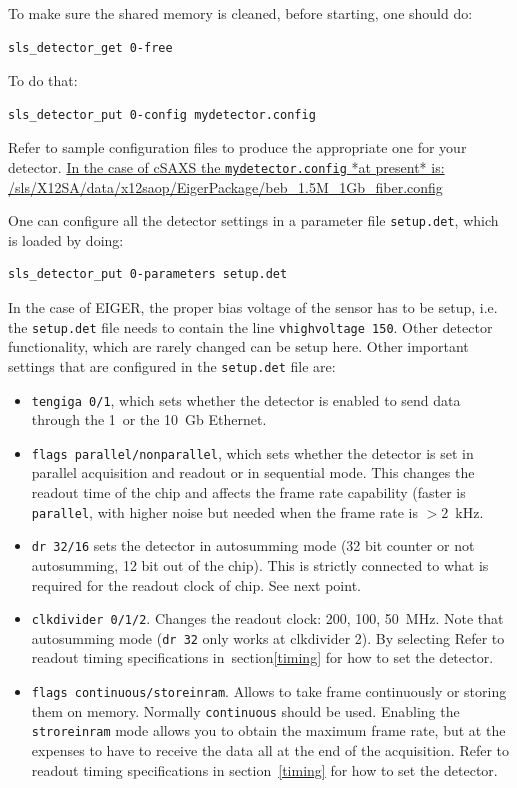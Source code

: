 \documentclass{article}
\newcommand{\E}{EIGER\xspace}
\begin{document}
To make sure the shared memory is cleaned, before starting, one should do:  
\begin{verbatim}
sls_detector_get 0-free
\end{verbatim}
To do that:
\begin{verbatim}
sls_detector_put 0-config mydetector.config
\end{verbatim}
Refer to sample configuration files to produce the appropriate one for your detector.
\underline{In the case of cSAXS the {\tt{mydetector.config}} *at present* is:}\\ 
\underline{/sls/X12SA/data/x12saop/EigerPackage/beb\_1.5M\_1Gb\_fiber.config}

One can configure all the detector settings in a parameter file {\tt{setup.det}}, which is loaded by doing:
\begin{verbatim}
sls_detector_put 0-parameters setup.det
\end{verbatim}

In the case of \E, the proper bias voltage of the sensor has to be setup, i.e. the {\tt{setup.det}} file needs to contain the line {\tt{vhighvoltage 150}}. Other detector functionality, which are rarely changed can be setup here. 
Other important settings that are configured in the {\tt{setup.det}} file are:
\begin{itemize}
\item {\tt{tengiga 0/1}}, which sets whether the detector is enabled to send data through the 1~or the 10~Gb Ethernet.
\item {\tt{flags parallel/nonparallel}}, which sets whether the detector is set in parallel acquisition and readout or in sequential mode. This changes the readout time of the chip and affects the frame rate capability (faster is {\tt{parallel}}, with higher noise but needed when the frame rate is $>2$~kHz. 
\item {\tt{dr 32/16}} sets the detector in autosumming mode (32 bit counter or not autosumming, 12 bit out of the chip). This is strictly connected to what is required for the readout clock of chip. See next point.
\item {\tt{clkdivider 0/1/2}}. Changes the readout clock: 200, 100, 50~MHz. Note that autosumming mode ({\tt{dr 32}} only works at {clkdivider 2}). By selecting Refer to readout timing specifications in~section\ref{timing} for how to set the detector. 
\item {\tt{flags continuous/storeinram}}. Allows to take frame continuously or storing them on memory. Normally {\tt{continuous}} should be used. Enabling the  {\tt{stroreinram}} mode allows you to obtain the maximum frame rate, but at the expenses to have to receive the data all at the end of the acquisition. Refer to readout timing specifications in section~\ref{timing} for how to set the detector.
\end{itemize}
\end{document}
